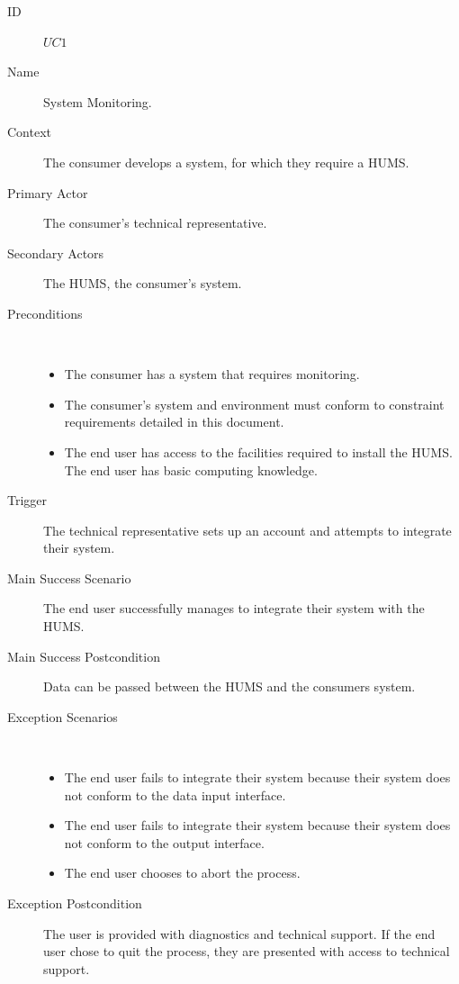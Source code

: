 \documentclass[10pt,a4paper]{article}
\begin{document}
\begin{description}
	\item[ID] $UC1$
	\item[Name]  System Monitoring.
	\item[Context] The consumer develops a system, for which they
	               require a HUMS.
	\item[Primary Actor] The consumer's technical representative.
	\item[Secondary Actors] The HUMS, the consumer's system.
	\item[Preconditions] ~
		\begin{itemize}
			\item The consumer has a system that requires monitoring.
	                 \item The consumer's system and environment must conform to constraint
	                     requirements detailed in this document. 
	                 \item The end user has access to the facilities required to install
	                    the HUMS. The end user has basic computing knowledge.
	          \end{itemize}
	\item[Trigger] The technical representative sets up an account and attempts to integrate
	               their system.
	\item[Main Success Scenario] The end user successfully manages to integrate
			their system with the HUMS.
	\item[Main Success Postcondition] Data can be passed between the HUMS and the 
					consumers system.
	\item[Exception Scenarios] ~
			\begin{itemize}
				\item The end user fails to integrate their system because
				      their system does not conform to the data input interface.
				\item The end user fails to integrate their system because
				      their system does not conform to the output interface.
				\item The end user chooses to abort the process.
			\end{itemize}
	\item[Exception Postcondition]
			The user is provided with diagnostics and technical support. 
			If the end user chose to quit the process, they are
			presented with access to technical support.
\end{description}
\end{document}
